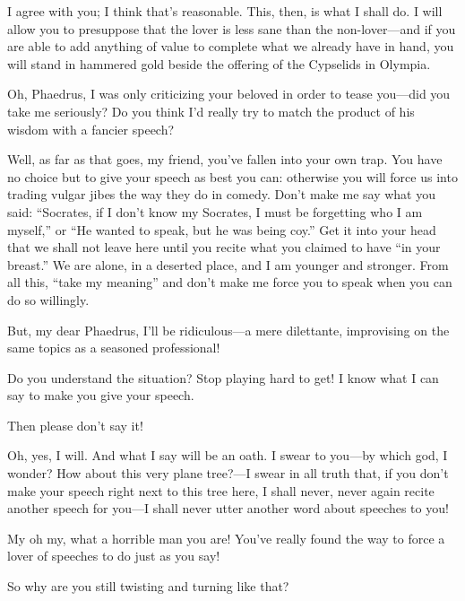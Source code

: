 \sayphaedrus I agree with you; I think that's reasonable. This, then, is
what I shall do. I will allow you to presuppose that the lover is less
sane than the non-lover---and if you are able to add anything of
value to complete what we already have in hand, you will stand in
hammered gold beside the offering of the Cypselids in
Olympia.

\saysocrates Oh, Phaedrus, I was only criticizing your beloved in order to
tease you---did you take me seriously? Do you think I'd really try to
match the product of his wisdom with a fancier speech?

\sayphaedrus Well, as far as that goes, my friend, you've fallen into your
own trap. You have no choice but to give your speech as best you can: 
otherwise you will force us into trading vulgar jibes the way
they do in comedy. Don't make me say what you said: “Socrates, if I
don't know my Socrates, I must be forgetting who I am myself,” or “He
wanted to speak, but he was being coy.” Get it into your head that we
shall not leave here until you recite what you claimed to have “in your
breast.” We are alone, in a deserted place, and I am younger and
stronger. From all this, “take my
meaning” and don't
make me force you to speak when you can do so willingly.

\saysocrates But, my dear Phaedrus, I'll be ridiculous---a mere dilettante,
improvising on the same topics as a seasoned professional!

\sayphaedrus Do you understand the situation? Stop playing hard to get! I
know what I can say to make you give your speech.

\saysocrates Then please don't say it!

\sayphaedrus Oh, yes, I will. And what I say will be an oath. I swear to
you---by which god, I wonder? How about this very plane tree?---I swear 
in all truth that, if you don't make your speech right next to
this tree here, I shall never, never again recite another speech for
you---I shall never utter another word about speeches to you!

\saysocrates My oh my, what a horrible man you are! You've really found the
way to force a lover of speeches to do just as you say!

\sayphaedrus So why are you still twisting and turning like that?

